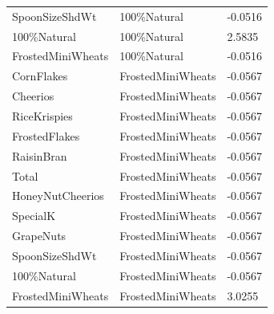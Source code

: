 \begin{table}[!htbp]
\begin{tabular}{lll}
SpoonSizeShdWt & 100\%Natural & -0.0516
\\
100\%Natural & 100\%Natural & 2.5835
\\
FrostedMiniWheats & 100\%Natural & -0.0516
\\
CornFlakes & FrostedMiniWheats & -0.0567
\\
Cheerios & FrostedMiniWheats & -0.0567
\\
RiceKrispies & FrostedMiniWheats & -0.0567
\\
FrostedFlakes & FrostedMiniWheats & -0.0567
\\
RaisinBran & FrostedMiniWheats & -0.0567
\\
Total & FrostedMiniWheats & -0.0567
\\
HoneyNutCheerios & FrostedMiniWheats & -0.0567
\\
SpecialK & FrostedMiniWheats & -0.0567
\\
GrapeNuts & FrostedMiniWheats & -0.0567
\\
SpoonSizeShdWt & FrostedMiniWheats & -0.0567
\\
100\%Natural & FrostedMiniWheats & -0.0567
\\
FrostedMiniWheats & FrostedMiniWheats & 3.0255
\\
\hline
\end{tabular}
\end{table}
